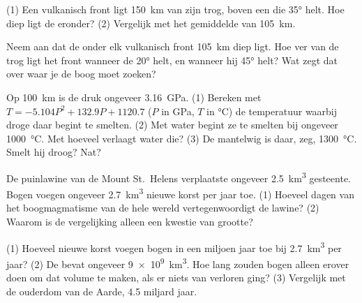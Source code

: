 \begin{exercise}[$\star\star$]\label{exo:g12:subduction-magmatism:6}
(1) Een vulkanisch front ligt \qty{150}{km} van zijn trog, boven een  die
\ang{35} helt. Hoe diep ligt de  eronder? (2) Vergelijk met het
gemiddelde van \qty{105}{km}.
\end{exercise}

\begin{exercise}[$\star\star$]\label{exo:g12:subduction-magmatism:7}
Neem aan dat de  onder elk vulkanisch front \qty{105}{km} diep ligt. Hoe ver van
de trog ligt het front wanneer de  \ang{20} helt, en wanneer hij
\ang{45} helt? Wat zegt dat over waar je de boog moet zoeken?
\end{exercise}

\begin{exercise}[$\star\star$]\label{exo:g12:subduction-magmatism:8}
Op \qty{100}{km} is de druk ongeveer \qty{3.16}{GPa}. (1) Bereken met $T =
-5.104P^2 + 132.9P + 1120.7$ ($P$ in \unit{GPa}, $T$ in \unit{\celsius})
de temperatuur waarbij droge  daar begint te smelten.
(2) Met water begint ze te smelten bij ongeveer \qty{1000}{\celsius}. Met hoeveel
verlaagt water die? (3) De mantelwig is daar, zeg,
\qty{1300}{\celsius}. Smelt hij droog? Nat?
\end{exercise}

\begin{exercise}[$\star\star$]\label{exo:g12:subduction-magmatism:9}
De puinlawine van de Mount St.~Helens verplaatste ongeveer \qty{2.5}{km^3}
gesteente. Bogen voegen ongeveer \qty{2.7}{km^3} nieuwe korst per jaar toe. (1) Hoeveel dagen
van het boogmagmatisme van de hele wereld vertegenwoordigt de lawine? (2) Waarom is de
vergelijking alleen een kwestie van grootte?
\end{exercise}

\begin{exercise}[$\star\star$]\label{exo:g12:subduction-magmatism:10}
(1) Hoeveel nieuwe korst voegen bogen in een miljoen jaar toe bij \qty{2.7}{km^3} per
jaar? (2) De  bevat ongeveer \qty{9e9}{km^3}. Hoe lang zouden
bogen alleen erover doen om dat volume te maken, als er niets van verloren ging? (3) Vergelijk met
de ouderdom van de Aarde, 4.5 miljard jaar.
\end{exercise}

